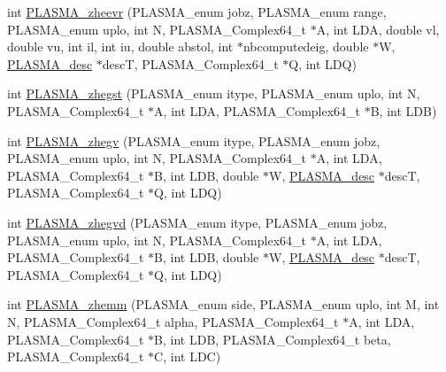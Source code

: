 \begin{DoxyCompactItemize}
\item 
int \hyperlink{group__PLASMA__Complex64__t_ga4658f650ae51fd533d3f2406b25aa70d_ga4658f650ae51fd533d3f2406b25aa70d}{P\+L\+A\+S\+M\+A\+\_\+zheevr} (P\+L\+A\+S\+M\+A\+\_\+enum jobz, P\+L\+A\+S\+M\+A\+\_\+enum range, P\+L\+A\+S\+M\+A\+\_\+enum uplo, int N, P\+L\+A\+S\+M\+A\+\_\+\+Complex64\+\_\+t $\ast$A, int L\+D\+A, double vl, double vu, int il, int iu, double abstol, int $\ast$nbcomputedeig, double $\ast$W, \hyperlink{structplasma__desc__t}{P\+L\+A\+S\+M\+A\+\_\+desc} $\ast$desc\+T, P\+L\+A\+S\+M\+A\+\_\+\+Complex64\+\_\+t $\ast$Q, int L\+D\+Q)
\item 
int \hyperlink{group__PLASMA__Complex64__t_ga387eb7a21f8b3d03aec26324255e7510_ga387eb7a21f8b3d03aec26324255e7510}{P\+L\+A\+S\+M\+A\+\_\+zhegst} (P\+L\+A\+S\+M\+A\+\_\+enum itype, P\+L\+A\+S\+M\+A\+\_\+enum uplo, int N, P\+L\+A\+S\+M\+A\+\_\+\+Complex64\+\_\+t $\ast$A, int L\+D\+A, P\+L\+A\+S\+M\+A\+\_\+\+Complex64\+\_\+t $\ast$B, int L\+D\+B)
\item 
int \hyperlink{group__PLASMA__Complex64__t_gaec004491cb00c99f63f9604c84ef8f43_gaec004491cb00c99f63f9604c84ef8f43}{P\+L\+A\+S\+M\+A\+\_\+zhegv} (P\+L\+A\+S\+M\+A\+\_\+enum itype, P\+L\+A\+S\+M\+A\+\_\+enum jobz, P\+L\+A\+S\+M\+A\+\_\+enum uplo, int N, P\+L\+A\+S\+M\+A\+\_\+\+Complex64\+\_\+t $\ast$A, int L\+D\+A, P\+L\+A\+S\+M\+A\+\_\+\+Complex64\+\_\+t $\ast$B, int L\+D\+B, double $\ast$W, \hyperlink{structplasma__desc__t}{P\+L\+A\+S\+M\+A\+\_\+desc} $\ast$desc\+T, P\+L\+A\+S\+M\+A\+\_\+\+Complex64\+\_\+t $\ast$Q, int L\+D\+Q)
\item 
int \hyperlink{group__PLASMA__Complex64__t_ga6ee549df75bf7738aa6066c564ff72a9_ga6ee549df75bf7738aa6066c564ff72a9}{P\+L\+A\+S\+M\+A\+\_\+zhegvd} (P\+L\+A\+S\+M\+A\+\_\+enum itype, P\+L\+A\+S\+M\+A\+\_\+enum jobz, P\+L\+A\+S\+M\+A\+\_\+enum uplo, int N, P\+L\+A\+S\+M\+A\+\_\+\+Complex64\+\_\+t $\ast$A, int L\+D\+A, P\+L\+A\+S\+M\+A\+\_\+\+Complex64\+\_\+t $\ast$B, int L\+D\+B, double $\ast$W, \hyperlink{structplasma__desc__t}{P\+L\+A\+S\+M\+A\+\_\+desc} $\ast$desc\+T, P\+L\+A\+S\+M\+A\+\_\+\+Complex64\+\_\+t $\ast$Q, int L\+D\+Q)
\item 
int \hyperlink{group__PLASMA__Complex64__t_gad53a9ae69e0ff46c3859f19c16b97081_gad53a9ae69e0ff46c3859f19c16b97081}{P\+L\+A\+S\+M\+A\+\_\+zhemm} (P\+L\+A\+S\+M\+A\+\_\+enum side, P\+L\+A\+S\+M\+A\+\_\+enum uplo, int M, int N, P\+L\+A\+S\+M\+A\+\_\+\+Complex64\+\_\+t alpha, P\+L\+A\+S\+M\+A\+\_\+\+Complex64\+\_\+t $\ast$A, int L\+D\+A, P\+L\+A\+S\+M\+A\+\_\+\+Complex64\+\_\+t $\ast$B, int L\+D\+B, P\+L\+A\+S\+M\+A\+\_\+\+Complex64\+\_\+t beta, P\+L\+A\+S\+M\+A\+\_\+\+Complex64\+\_\+t $\ast$C, int L\+D\+C)

\end{DoxyCompactItemize}
